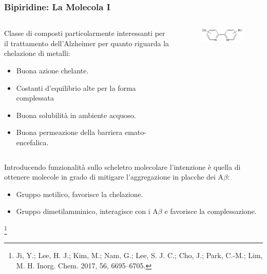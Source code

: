 \documentclass[9pt]{beamer}
\newcommand\blfootnote[1]{%
	\begingroup
	\renewcommand\thefootnote{}\footnote{#1}%
	\addtocounter{footnote}{-1}%
	\endgroup
}
\begin{document}
\begin{frame}
	\frametitle{Bipiridine: La Molecola I}
	\begin{columns}
		\begin{column}{.6\textwidth}
			Classe di composti particolarmente interessanti per il trattamento dell'Alzheimer per quanto riguarda la chelazione di metalli:
			\begin{itemize}
				\item Buona azione chelante.
				\item Costanti d'equilibrio alte per la forma complessata
				\item Buona solubilità in ambiente acquoso.
				\item Buona permeazione della barriera emato-encefalica.
			\end{itemize}
		\end{column}
		\begin{column}{.4\textwidth}
			\begin{figure}
				\includegraphics[width=\textwidth]{immagini/bpy.png}
			\end{figure}
		\end{column}
	\end{columns}
	\bigskip
	Introducendo funzionalità sullo scheletro molecolare l'intenzione è quella di ottenere molecole in grado di mitigare l'aggregazione in placche dei A$\beta$:
	\begin{itemize}
		\item Gruppo metilico, favorisce la chelazione.
		\item Gruppo dimetilamminico, interagisce con i A$\beta$ e favorisce la complessazione.
	\end{itemize}
	\blfootnote{Ji, Y.; Lee, H. J.; Kim, M.; Nam, G.; Lee, S. J. C.; Cho, J.; Park, C.-M.; Lim, M. H. Inorg. Chem. 2017,
		56, 6695–6705.}
\end{frame}
\end{document}
